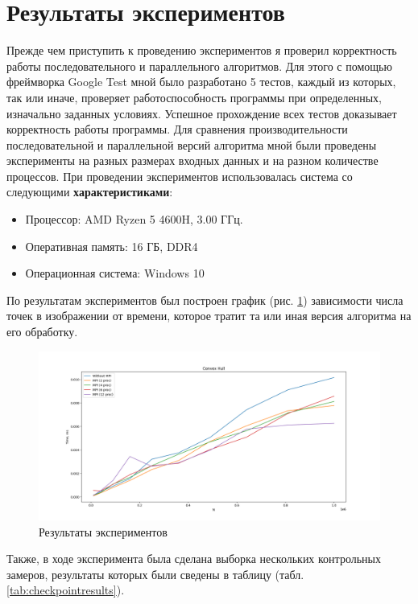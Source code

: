 \section{Результаты экспериментов}
Прежде чем приступить к проведению экспериментов я проверил корректность работы последовательного и параллельного алгоритмов. Для этого с помощью фреймворка Google Test мной было разработано 5 тестов, каждый из которых, так или иначе, проверяет работоспособность программы при определенных, изначально заданных условиях. Успешное прохождение всех тестов доказывает корректность работы программы.\n
Для сравнения производительности последовательной и параллельной версий алгоритма мной были проведены эксперименты на разных размерах входных данных и на разном количестве процессов. При проведении экспериментов использовалась система со следующими \textbf{характеристиками}:
\begin{itemize}
	\item Процессор: AMD Ryzen 5 4600H, 3.00 ГГц.
	\item Оперативная память: 16 ГБ, DDR4
	\item Операционная система: Windows 10
\end{itemize}
По результатам экспериментов был построен график (рис. \ref{fig:results}) зависимости числа точек в изображении от времени, которое тратит та или иная версия алгоритма на его обработку.
\begin{figure}[H]
	\centering
	\includegraphics[width=\linewidth]{img/test.png}
	\caption{Результаты экспериментов}
	\label{fig:results}
\end{figure}
Также, в ходе эксперимента была сделана выборка нескольких контрольных замеров, результаты которых были сведены в таблицу (табл. \ref{tab:checkpointresults}).

